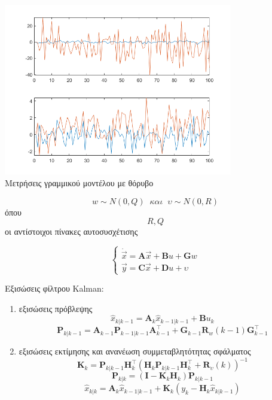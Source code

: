 \documentclass[10pt]{article}
\begin{document}
\begin{center}
\includegraphics[width=10cm]{images/lin_model_measurements.png} \\
Μετρήσεις γραμμικού μοντέλου με θόρυβο
\end{center}

\[ w \sim N(0, Q) \;\; και \;\; υ \sim N(0,R) \]
όπου $$ R, Q $$ οι αντίστοιχοι πίνακες αυτοσυσχέτισης

\[
\begin{cases}
\dot{\vec{x}} = \mathbf{A}\vec{x} + \mathbf{B}u + \mathbf{G}w \\
\vec{y} = \mathbf{C}\vec{x} + \mathbf{D}u + υ
\end{cases}
\]

Εξισώσεις φίλτρου \textlatin{Kalman}:
\begin{enumerate}
	\item εξισώσεις πρόβλεψης
	\[ \hat{x}_{k|k-1} = \mathbf{A}_{k}\hat{x}_{k-1|k-1} + \mathbf{B}u_k \]
	\[ \mathbf{P}_{k|k-1} = \mathbf{A}_{k-1}\mathbf{P}_{k-1|k-1}\mathbf{A}_{k-1}^{\top} + \mathbf{G}_{k-1}\mathbf{R}_{w}(k-1)\mathbf{G}_{k-1}^{\top} \]
	\item εξισώσεις εκτίμησης και ανανέωση συμμεταβλητότητας σφάλματος
	\[ \mathbf{K}_k = \mathbf{P}_{k|k-1} \mathbf{H}_k^\top ( \mathbf{H}_k \mathbf{P}_{k|k-1} \mathbf{H}_k^\top + \mathbf{R}_υ(k) )^{-1} \]
	\[ \mathbf{P}_{k|k} = ( \mathbf{I} - \mathbf{K}_k\mathbf{H}_k ) \mathbf{P}_{k|k-1} \]
	\[ \hat{x}_{k|k} = \mathbf{A}_{k}\hat{x}_{k-1|k-1} + \mathbf{K}_k (y_k - \mathbf{H}_k \hat{x}_{k|k-1} ) \]
\end{enumerate}


\end{document}
